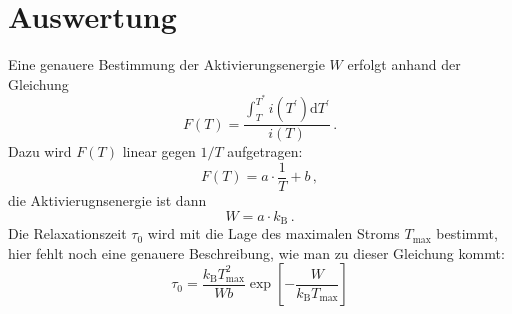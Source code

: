 \section{Auswertung}

Eine genauere Bestimmung der Aktivierungsenergie $W$ erfolgt anhand der Gleichung
\begin{equation*}
    F(T) = \frac{\int_T^{T^\ast} i(T^\prime)\mathrm{d}T^\prime}{i(T)}\,.
\end{equation*}
Dazu wird $F(T)$ linear gegen $1/T$ aufgetragen:
\begin{equation*}
    F(T) = a \cdot\frac{1}{T} + b\,,
\end{equation*}
die Aktivierugnsenergie ist dann
\begin{equation*}
    W = a \cdot k_\text{B}\,.
\end{equation*}
Die Relaxationszeit $\tau_0$ wird mit die Lage des maximalen Stroms $T_\text{max}$ bestimmt, hier fehlt noch eine genauere Beschreibung, wie man zu dieser Gleichung kommt:
\begin{equation}
    \label{eqn:tau0}
    \tau_0 = \frac{k_\text{B}T_\text{max}^2}{Wb}
             \exp\!\left[-\frac{W}{k_\text{B}T_\text{max}} \right]
\end{equation}
